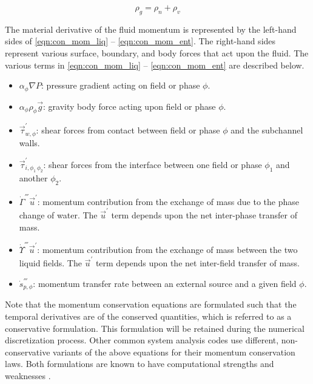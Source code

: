 \begin{equation}
\label{eqn:gaseous_density}
\rho_g = \rho_n + \rho_v
\end{equation}

The material derivative of the fluid momentum is represented by the left-hand sides of \eqref{eqn:con_mom_liq} -- \eqref{eqn:con_mom_ent}.
The right-hand sides represent various surface, boundary, and body forces that act upon the fluid.
The various terms in \eqref{eqn:con_mom_liq} -- \eqref{eqn:con_mom_ent} are described below.

\begin{itemize}
\item{
$\alpha_{\phi} \nabla P$:
pressure gradient acting on field or phase $\phi$.
}
\item{
$\alpha_{\phi} \rho_{\phi} \vec{g}$:
gravity body force acting upon field or phase $\phi$.
}
\item{
$\vec{\tau}^{'}_{w,\phi}$:
 shear forces from contact between field or phase $\phi$ and the subchannel walls. 
}
\item{
$\vec{\tau}^{'}_{i,\phi_1\,\phi_2}$:
 shear forces from the interface between one field or phase $\phi_1$ and another $\phi_2$. 
}
\item{
$\dot{\Gamma}^{'''}\vec{u}^{'}$:
 momentum contribution from the exchange of mass due to the phase change of water.
 The $\vec{u}^{'}$ term depends upon the net inter-phase transfer of mass.
}
\item{
$\dot{\Upsilon}^{'''}\vec{u}^{'}$:
 momentum contribution from the exchange of mass between the two liquid fields.
 The $\vec{u}^{'}$ term depends upon the net inter-field transfer of mass.
}
\item{
$\dot{s}^{'''}_{p,\phi}$:
 momentum transfer rate between an external source and a given field $\phi$.
}
\end{itemize}

Note that the momentum conservation equations are formulated such that the temporal derivatives are of the conserved quantities, which is referred to as a conservative formulation.
This formulation will be retained during the numerical discretization process.
Other common system analysis codes \cite{TRACE, RELAP} use different, non-conservative variants of the above equations for their momentum conservation laws.
Both formulations are known to have computational strengths and weaknesses \cite{Park2009a}.

